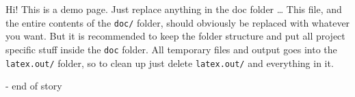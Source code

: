 \documentclass[12pt,a4paper]{report}
\begin{document}
\begin{center}
    \huge{Hi! This is a demo page. Just replace anything in the doc folder \ldots}
    \break{}
    \normalsize
    This file, and the entire contents of the \texttt{doc/} folder, should obviously be replaced with whatever you want. But it is recommended to keep the folder structure and put all project specific stuff inside the \texttt{doc} folder. All temporary files and output goes into the \texttt{latex.out/} folder, so to clean up just delete \texttt{latex.out/} and everything in it.
    \vfill
    \vspace{50mm}
    
    \vspace{50mm}
    \break{}
    \huge{- end of story}
    \vfill
\end{center}
\end{document}
